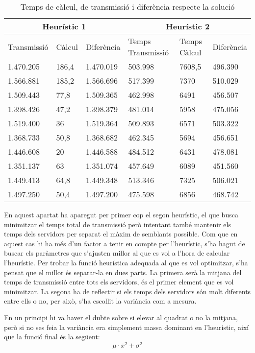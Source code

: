 \documentclass[a4paper, 12pt]{article}
\begin{document}
\begin{table}[h!]
\begin{tabular}{l | l | l || l | l | l}
	\multicolumn{3}{c||}{Heurístic 1} & \multicolumn{3}{c}{Heurístic 2} \\
	\hline
	Transmissió & Càlcul & Diferència & Temps Transmissió & Temps Càlcul & Diferència \\
	\hline
	1.470.205 &	186,4&	1.470.019&	503.998	& 7608,5&	496.390 \\
	1.566.881&	185,2&	1.566.696&	517.399&	7370&	510.029 \\
	1.509.443&	77,8&	1.509.365&	462.998&	6491&	456.507 \\
	1.398.426&	47,2&	1.398.379&	481.014&	5958&	475.056 \\
	1.519.400&	36	&1.519.364	& 509.893&	6571&	503.322 \\
	1.368.733&	50,8&	1.368.682&	462.345&	5694&	456.651 \\
	1.446.608&	20	&1.446.588	& 484.512&	6431&	478.081 \\
	1.351.137&	63	&1.351.074	& 457.649&	6089&	451.560 \\
	1.449.413&	64,8&	1.449.348&	513.346&	7325&	506.021 \\
	1.497.250&	50,4&	1.497.200&	475.598&	6856&	468.742 \\
\end{tabular}
\caption{Temps de càlcul, de transmissió i diferència respecte la solució}
\end{table}

En aquest apartat ha aparegut per primer cop el segon heurístic, el que busca minimitzar el 
temps total de transmissió però intentant també mantenir els temps dels servidors per
separat el màxim de semblants possible. Com que en aquest cas hi ha més d'un factor a tenir en compte
per l'heurístic, s'ha hagut de buscar els paràmetres que s'ajusten millor al que es vol a l'hora de 
calcular l'heurístic. 
Per trobar la funció heurística adequada al que es vol optimitzar, s'ha pensat que el millor és separar-la
en dues parts. La primera serà la mitjana del temps de transmissió entre tots els servidors, és el primer
element que es vol minimitzar. La segona ha de reflectir si els temps dels servidors són molt diferents
entre ells o no, per això, s'ha escollit la variància com a mesura.

En un principi hi va haver el dubte sobre si elevar al quadrat o no la mitjana, però si no ses feia
la variància era simplement massa dominant en l'heurístic, així que la funció final és la següent:
$$\mu\cdot\overline{x}^2 + \sigma^2$$
\end{document}
